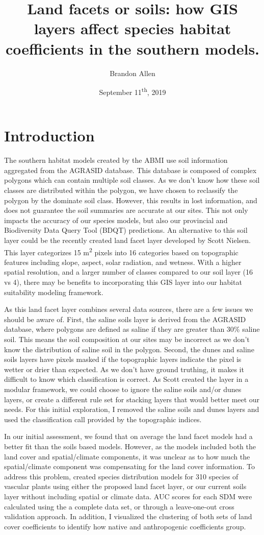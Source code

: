 \documentclass[12pt]{article}
\title{Land facets or soils: how GIS layers affect species habitat coefficients in the southern models.}
\author{Brandon Allen}
\date{September 11\textsuperscript{th}, 2019}
\begin{document}
\maketitle

\section{Introduction}

The southern habitat models created by the ABMI use soil information aggregated from the AGRASID database. This database is composed of complex polygons which can contain multiple soil classes. As we don’t know how these soil classes are distributed within the polygon, we have chosen to reclassify the polygon by the dominate soil class. However, this results in lost information, and does not guarantee the soil summaries are accurate at our sites. This not only impacts the accuracy of our species models, but also our provincial and Biodiversity Data Query Tool (BDQT) predictions. An alternative to this soil layer could be the recently created land facet layer developed by Scott Nielsen. This layer categorizes 15 m\textsuperscript{2} pixels into 16 categories based on topographic features including slope, aspect, solar radiation, and wetness. With a higher spatial resolution, and a larger number of classes compared to our soil layer (16 vs 4), there may be benefits to incorporating this GIS layer into our habitat suitability modeling framework.


As this land facet layer combines several data sources, there are a few issues we should be aware of. First, the saline soils layer is derived from the AGRASID database, where polygons are defined as saline if they are greater than 30\% saline soil. This means the soil composition at our sites may be incorrect as we don’t know the distribution of saline soil in the polygon. Second, the dunes and saline soils layers have pixels masked if the topographic layers indicate the pixel is wetter or drier than expected. As we don’t have ground truthing, it makes it difficult to know which classification is correct. As Scott created the layer in a modular framework, we could choose to ignore the saline soils and/or dunes layers, or create a different rule set for stacking layers that would better meet our needs. For this initial exploration, I removed the saline soils and dunes layers and used the classification call provided by the topographic indices.


In our initial assessment, we found that on average the land facet models had a better fit than the soils based models. However, as the models included both the land cover and spatial/climate components, it was unclear as to how much the spatial/climate component was compensating for the land cover information. To address this problem, created species distribution models for 310 species of vascular plants using either the proposed land facet layer, or our current soils layer without including spatial or climate data. AUC scores for each SDM were calculated using the a complete data set, or through a leave-one-out cross validation approach. In addition, I visualized the clustering of both sets of land cover coefficients to identify how native and anthropogenic coefficients group.
\end{document}
